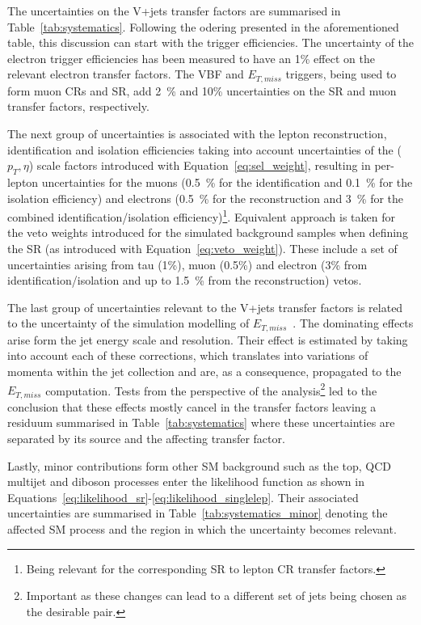 \hspace{10pt} The uncertainties on the V+jets transfer factors are summarised in Table~\ref{tab:systematics}. Following the odering presented in the aforementioned table, this discussion can start with the trigger efficiencies. The uncertainty of the electron trigger efficiencies has been measured to have an 1\% effect on the relevant electron transfer factors. The VBF and $E_{T,miss}$ triggers, being used to form muon CRs and SR, add 2~\% and 10\% uncertainties on the SR and muon transfer factors, respectively.

\hspace{10pt} The next group of uncertainties is associated with the lepton reconstruction, identification and isolation efficiencies taking into account uncertainties of the ($p_T,\eta$) scale factors introduced with Equation~\ref{eq:sel_weight}, resulting in per-lepton uncertainties for the muons (0.5~\% for the identification and 0.1~\% for the isolation efficiency) and electrons (0.5~\% for the reconstruction and 3~\% for the combined identification/isolation efficiency)\footnote{Being relevant for the corresponding SR to lepton CR transfer factors.}. Equivalent approach is taken for the veto weights introduced for the simulated background samples when defining the SR (as introduced with Equation~\ref{eq:veto_weight}). These include a set of uncertainties arising from tau (1\%), muon (0.5\%) and electron (3\% from identification/isolation and up to 1.5~\% from the reconstruction) vetos.


\hspace{10pt} The last group of uncertainties relevant to the V+jets transfer factors is related to the uncertainty of the simulation modelling of $E_{T,miss}$~\cite{paper:met_performance}. The dominating effects arise form the jet energy scale and resolution. Their effect is estimated by taking into account each of these corrections, which translates into variations of momenta within the jet collection and are, as a consequence, propagated to the $E_{T,miss}$ computation. Tests from the perspective of the analysis\footnote{Important as these changes can lead to a different set of jets being chosen as the desirable pair.} led to the conclusion that these effects mostly cancel in the transfer factors leaving a residuum summarised in Table~\ref{tab:systematics} where these uncertainties are separated by its source and the affecting transfer factor.


\hspace{10pt} Lastly, minor contributions form other SM background such as the top, QCD multijet and diboson processes enter the likelihood function as shown in Equations~\ref{eq:likelihood_sr}-\ref{eq:likelihood_singlelep}. Their associated uncertainties are summarised in Table~\ref{tab:systematics_minor} denoting the affected SM process and the region in which the uncertainty becomes relevant.


